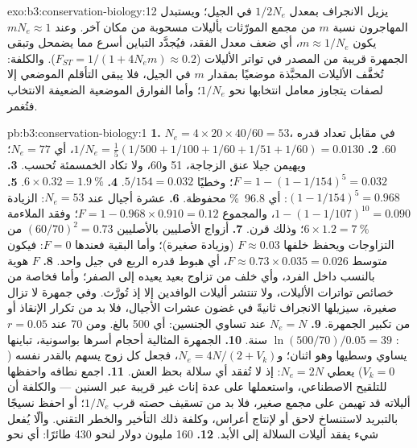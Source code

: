 \begin{solution}{exo:b3:conservation-biology:12}
يزيل الانجراف  بمعدل $1/2N_{e}$ في الجيل؛
ويستبدل المهاجرون نسبة $m$ من مجمع المورّثات بأليلات مسحوبة
من مكان آخر. وعند $mN_{e} \approx 1$ يكون $m \approx 1/N_{e}$، أي ضعف
معدل الفقد، فيُجدَّد التباين أسرع مما يضمحل وتبقى
الجمهرة قريبة من المصدر في تواتر الأليلات ($F_{ST} = 1/(1
+ 4N_{e}m) \approx 0.2$). والكلفة: تُخفَّف الأليلات المحبَّذة موضعيًا
بمقدار $m$ في الجيل، فلا يبقى التأقلم الموضعي إلا لصفات
يتجاوز معامل انتخابها نحو $1/N_{e}$؛ وأما الفوارق الموضعية
الضعيفة الانتخاب فتُغمر.
\end{solution}

\begin{solution}{pb:b3:conservation-biology:1}
\textbf{1.} $N_{e} = 4\times 20\times 40/60 = 53$، في مقابل تعداد قدره 60.
\textbf{2.} $1/N_{e} = \tfrac{1}{5}(1/500 + 1/100 + 1/60 + 1/51 + 1/60) =
0.0130$، أي $N_{e} = 77$؛ ويهيمن جيلا عنق الزجاجة، 51 و60،
ولا تكاد الخمسمئة تُحسب.
\textbf{3.} $F = 1 - (1 - 1/154)^{5} = 0.032$؛ وخطيًا $5/154 = 0.032$.
\textbf{4.} $6\times 0.32 = \qty{1.9}{\%}$.
\textbf{5.} $(1 - 1/154)^{5} = 0.968$: أي \qty{96.8}{\%} محفوظة.
\textbf{6.} عشرة أجيال عند $N_{e} = 53$: الزيادة $1 - (1 -
1/107)^{10} = 0.090$، والمجموع $F = 1 - 0.968\times 0.910 = 0.12$؛ وفقد
الملاءمة $6\times 1.2 = \qty{7}{\%}$؛ وذلك قرن.
\textbf{7.} أزواج الأصليين بالأصليين $(60/70)^{2} = 0.73$ من التزاوجات
ويحفظ خلفها $F \approx 0.03$ (وزيادة صغيرة)؛ وأما البقية
فعندها $F = 0$: فيكون متوسط $F \approx 0.73\times 0.035 = 0.026$، أي هبوط
قدره الربع في جيل واحد.
\textbf{8.} $F$ هوية بالنسب داخل الفرد، وأي خلف من تزاوج
بعيد يعيده إلى الصفر؛ وأما  فخاصة من خصائص
تواترات الأليلات، ولا تنتشر أليلات الوافدين إلا إذ
تُورَّث. وفي جمهرة لا تزال صغيرة، سيزيلها الانجراف ثانيةً
في غضون عشرات الأجيال، فلا بد من تكرار الإنقاذ أو من تكبير
الجمهرة.
\textbf{9.} $N_{e} = N$ عند تساوي الجنسين: أي 500 بالغ. ومن 70 عند $r =
0.05$: $\ln(500/70)/0.05 = 39$ سنة.
\textbf{10.} الجمهرة المثالية أحجام أسرها بواسونية، تباينها
يساوي وسطيها وهو اثنان؛ و$N_{e} = 4N/(2 + V_{k})$، فجعل كل زوج
يسهم بالقدر نفسه ($V_{k} = 0$) يعطي $N_{e} = 2N$: إذ لا تُفقد أي
سلالة بحظ العش.
\textbf{11.} اجمع نطافه واحفظها للتلقيح الاصطناعي،
واستعملها على عدة إناث غير قريبة عبر السنين --- والكلفة
أن أليلاته قد تهيمن على مجمع صغير، فلا بد من تسقيف حصته
قرب $1/N_{e}$؛ أو احفظ نسيجًا بالتبريد لاستنساخ لاحق أو
لإنتاج أعراس، وكلفة ذلك التأخير والخطر التقني. وألّا يُفعل
شيء يفقد أليلات السلالة إلى الأبد.
\textbf{12.} \qty{160}{} مليون دولار لنحو 430 طائرًا: أي نحو

\end{solution}
